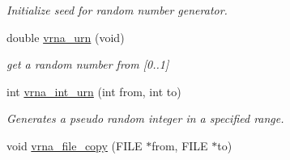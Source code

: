 \begin{DoxyCompactItemize}
\begin{DoxyCompactList}\small\item\em Initialize seed for random number generator. \end{DoxyCompactList}\item 
double \hyperlink{group__utils_ga384e256ebb295d04a14426179db0dd6e}{vrna\+\_\+urn} (void)
\begin{DoxyCompactList}\small\item\em get a random number from \mbox{[}0..1\mbox{]} \end{DoxyCompactList}\item 
int \hyperlink{group__utils_ga46111bb3747dbcf4609f0d40ae169ad9}{vrna\+\_\+int\+\_\+urn} (int from, int to)
\begin{DoxyCompactList}\small\item\em Generates a pseudo random integer in a specified range. \end{DoxyCompactList}\item 
\hypertarget{group__utils_ga4382a56d2fee9ed738364b99329edc7c}{}void \hyperlink{group__utils_ga4382a56d2fee9ed738364b99329edc7c}{vrna\+\_\+file\+\_\+copy} (F\+I\+L\+E $\ast$from, F\+I\+L\+E $\ast$to)\label{group__utils_ga4382a56d2fee9ed738364b99329edc7c}


\end{DoxyCompactItemize}
